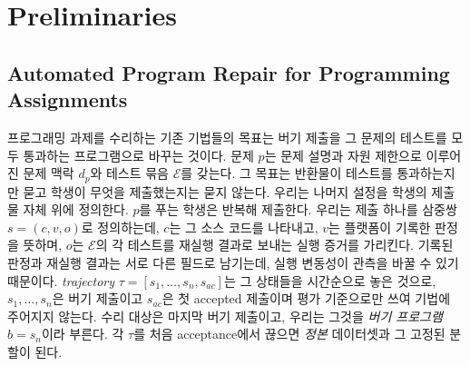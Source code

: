 \documentclass[10pt,conference]{IEEEtran}
\begin{document}
\section{Preliminaries}
\label{sec:preliminaries}
\subsection{Automated Program Repair for Programming Assignments}
\label{sec:formulation}

프로그래밍 과제를 수리하는 기존 기법들의 목표는 버기 제출을 그 문제의 테스트를 모두 통과하는 프로그램으로 바꾸는 것이다. 문제 \(p\)는 문제 설명과 자원 제한으로 이루어진 문제 맥락 \(d_p\)와 테스트 묶음 \(\mathcal E\)를 갖는다. 그 목표는 반환물이 테스트를 통과하는지만 묻고 학생이 무엇을 제출했는지는 묻지 않는다. 우리는 나머지 설정을 학생의 제출물 자체 위에 정의한다. \(p\)를 푸는 학생은 반복해 제출한다. 우리는 제출 하나를 삼중쌍 \(s=(c,v,o)\)로 정의하는데, \(c\)는 그 소스 코드를 나타내고, \(v\)는 플랫폼이 기록한 판정을 뜻하며, \(o\)는 \(\mathcal E\)의 각 테스트를 재실행 결과로 보내는 실행 증거를 가리킨다. 기록된 판정과 재실행 결과는 서로 다른 필드로 남기는데, 실행 변동성이 관측을 바꿀 수 있기 때문이다. \emph{trajectory} \(\tau=[s_1,\ldots,s_n,s_{\mathit{ac}}]\)는 그 상태들을 시간순으로 놓은 것으로, \(s_1,\ldots,s_n\)은 버기 제출이고 \(s_{\mathit{ac}}\)은 첫 accepted 제출이며 평가 기준으로만 쓰여 기법에 주어지지 않는다. 수리 대상은 마지막 버기 제출이고, 우리는 그것을 \emph{버기 프로그램} \(b=s_n\)이라 부른다. 각 \(\tau\)를 처음 acceptance에서 끊으면 \emph{정본} 데이터셋과 그 고정된 분할이 된다.
\end{document}
